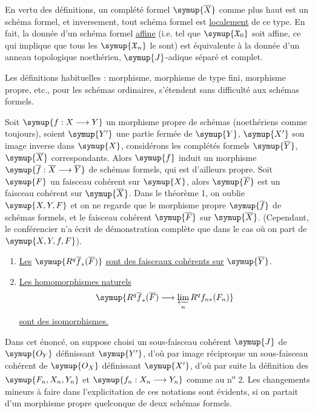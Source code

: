 En vertu des définitions, un complété formel $\symup{\overline X}$ comme plus haut est
un schéma formel, et inversement, tout schéma formel est \uline{localement} de ce
type. En fait, la donnée d'un schéma formel \uline{affine} (i.e. tel que
$\symup{\mathfrak X_0}$ soit affine, ce qui implique que tous les $\symup{\mathfrak X_n}$ le
sont) est équivalente à la donnée d'un anneau topologique noethérien,
$\symup{J}$-adique séparé et complet.

Les définitions habituelles : morphisme, morphisme de type fini, morphisme
propre, etc., pour les schémas ordinaires, s'étendent sans difficulté aux
schémas formels.


Soit $\symup{f:X\longrightarrow Y}$ un morphisme propre de schémas (noethériens comme
toujours), soient $\symup{Y'}$ une partie fermée de $\symup{Y}$, $\symup{X'}$ son image inverse dans $\symup{X}$,
considérons les complétés formels $\symup{\overline Y}$, $\symup{\overline X}$ correspondants.
Alors $\symup{f}$ induit un morphisme
$\symup{\overline f:\overline X\longrightarrow\overline Y}$ de schémas formels, qui est
d'ailleurs propre. Soit $\symup{F}$ un faisceau cohérent sur $\symup{X}$, alors $\symup{\overline F}$
est un faisceau cohérent sur $\symup{\overline X}$. Dans le théorème 1, on oublie
$\symup{X,Y,F}$ et on ne regarde que le morphisme propre $\symup{\overline f}$ de schémas
formels, et le faisceau cohérent $\symup{\overline F}$ sur $\symup{\overline X}$. (Cependant,
le conférencier n'a écrit de démonstration complète que dans le cas où on part
de $\symup{X,Y,f,F}$).

\begin{enumerate}
  \item[\textnormal{i.}] \uline{Les} $\symup{R^{q}\overline f_{*}(\overline F)}$ \uline{sont des faisceaux
    cohérents sur} $\symup{\overline Y}$.
  \item[\textnormal{ii.}] \uline{Les homomorphismes naturels}
    \[
      \symup{R^{q}\overline f_{*}(\overline F)
      \longrightarrow \varprojlim\limits_n R^{q}f_{n*}(F_n)}
    \]
    \uline{sont des isomorphismes.}
\end{enumerate}

Dans cet énoncé, on suppose choisi un sous-faisceau cohérent $\symup{J}$ de $\symup{O_Y}$
définissant $\symup{Y'}$, d'où par image réciproque un sous-faisceau cohérent de
$\symup{O_X}$ définissant $\symup{X'}$, d'où par suite la définition des $\symup{F_n,X_n,Y_n}$ et
$\symup{f_n:X_n\longrightarrow Y_n}$ comme au n\textsuperscript{o} 2. Les changements
mineurs à faire dans l'explicitation de ces notations sont évidents, si on
partait d'un morphisme propre quelconque de deux schémas formels.

